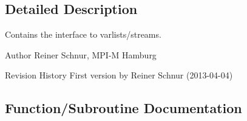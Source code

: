 \subsection{Detailed Description}
Contains the interface to varlists/streams. 

\begin{DoxyAuthor}{Author}
Reiner Schnur, M\+P\+I-\/\+M Hamburg
\end{DoxyAuthor}
\begin{DoxyParagraph}{Revision History}
First version by Reiner Schnur (2013-\/04-\/04) 
\end{DoxyParagraph}


\subsection{Function/\+Subroutine Documentation}
\hypertarget{namespacemo__jsb__varlist__iface_a1a7673f9db168055de30bc6f735a7ecb}{}
